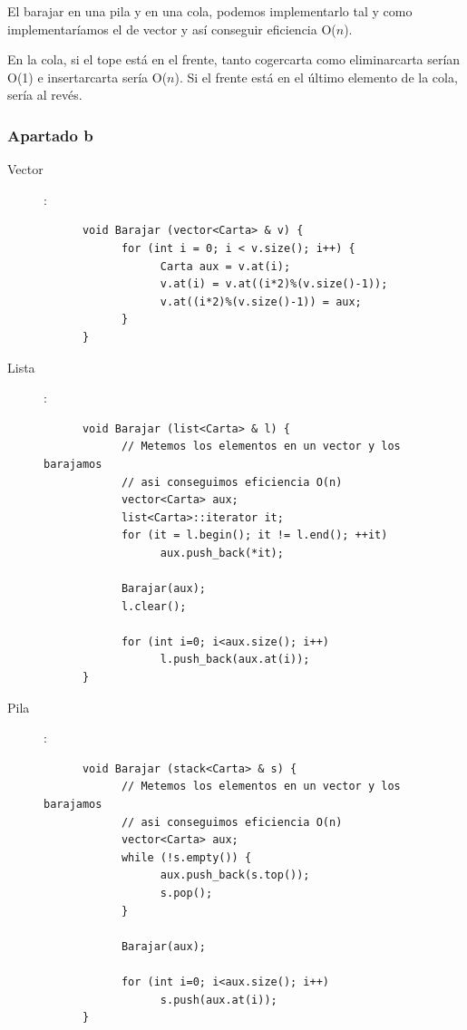 \documentclass[10pt,a4paper,spanish]{report}
\begin{document}
\noindent
El barajar en una pila y en una cola, podemos implementarlo tal y como implementaríamos el de vector y así conseguir eficiencia O($n$).

\noindent
En la cola, si el tope está en el frente, tanto cogercarta como eliminarcarta serían O(1) e insertarcarta sería O($n$). Si el frente está en el último elemento de la cola, sería al revés.

\subsubsection{\textcolor[rgb]{0.5,0.8,1}Apartado b}
\begin{description}
      \item[Vector]:
      \begin{verbatim}
      void Barajar (vector<Carta> & v) {
            for (int i = 0; i < v.size(); i++) {
                  Carta aux = v.at(i);
                  v.at(i) = v.at((i*2)%(v.size()-1));
                  v.at((i*2)%(v.size()-1)) = aux;     
            }
      }
      \end{verbatim}

      \item[Lista]:
      \begin{verbatim}
      void Barajar (list<Carta> & l) {
            // Metemos los elementos en un vector y los barajamos
            // asi conseguimos eficiencia O(n)
            vector<Carta> aux;
            list<Carta>::iterator it;
            for (it = l.begin(); it != l.end(); ++it)
                  aux.push_back(*it);

            Barajar(aux);
            l.clear();

            for (int i=0; i<aux.size(); i++)
                  l.push_back(aux.at(i));
      }
      \end{verbatim}

      \item[Pila]:
      \begin{verbatim}
      void Barajar (stack<Carta> & s) {
            // Metemos los elementos en un vector y los barajamos
            // asi conseguimos eficiencia O(n)
            vector<Carta> aux;
            while (!s.empty()) {
                  aux.push_back(s.top());
                  s.pop();
            }

            Barajar(aux);

            for (int i=0; i<aux.size(); i++)
                  s.push(aux.at(i));
      }
      \end{verbatim}


\end{description}
\end{document}

